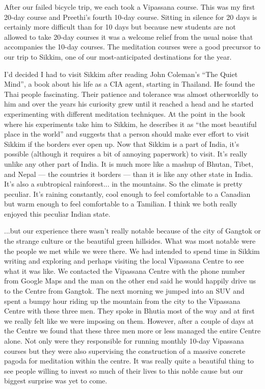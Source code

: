 \documentclass{article}
\begin{document}
After our failed bicycle trip, we each took a Vipassana course. This was my first
20-day course and Preethi's fourth 10-day course. Sitting in silence for 20 days is
certainly more difficult than for 10 days but because new students are not allowed to
take 20-day courses it was a welcome relief from the usual noise that accompanies the
10-day courses. The meditation courses were a good precursor to our trip to Sikkim,
one of our most-anticipated destinations for the year.

I'd decided I had to visit Sikkim after reading John Coleman's ``The Quiet Mind'', a
book about his life as a CIA agent, starting in Thailand. He found the Thai people
fascinating. Their patience and tolerance was almost otherworldly to him and over the
years his curiosity grew until it reached a head and he started experimenting with
different meditation techniques. At the point in the book where his experiments take
him to Sikkim, he describes it as ``the most beautiful place in the world'' and
suggests that a person should make ever effort to visit Sikkim if the borders ever
open up. Now that Sikkim is a part of India, it's possible (although it requires a
bit of annoying paperwork) to visit. It's really unlike any other part of India. It
is much more like a mashup of Bhutan, Tibet, and Nepal --- the countries it borders
--- than it is like any other state in India. It's also a subtropical
rainforest... in the mountains. So the climate is pretty peculiar. It's raining
constantly, cool enough to feel comfortable to a Canadian but warm enough to feel
comfortable to a Tamilian. I think we both really enjoyed this peculiar Indian
state.

...but our experience there wasn't really notable because of the city of Gangtok or
the strange culture or the beautiful green hillsides. What was most notable were the
people we met while we were there. We had intended to spend time in Sikkim writing
and exploring and perhaps visiting the local Vipassana Centre to see what it was
like. We contacted the Vipassana Centre with the phone number from Google Maps and
the man on the other end said he would happily drive us to the Centre from
Gangtok. The next morning we jumped into an SUV and spent a bumpy hour riding up the
mountain from the city to the Vipassana Centre with these three men. They spoke in
Bhutia most of the way and at first we really felt like we were imposing on
them. However, after a couple of days at the Centre we found that these three men
more or less managed the entire Centre alone. Not only were they responsible for
running monthly 10-day Vipassana courses but they were also supervising the
construction of a massive concrete pagoda for meditation within the centre. It was
really quite a beautiful thing to see people willing to invest so much of their lives
to this noble cause but our biggest surprise was yet to come.
\end{document}
